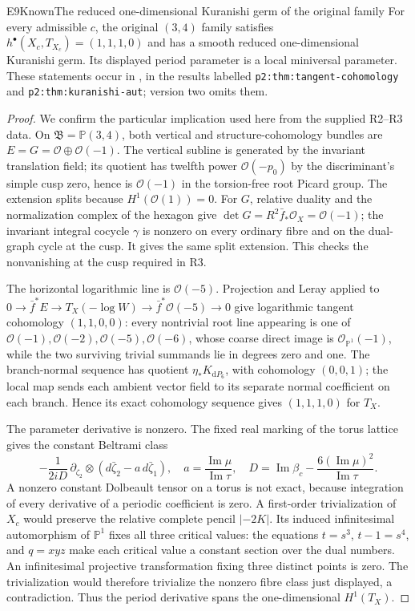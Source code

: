 \begin{statement}{E9}{Known}{The reduced one-dimensional Kuranishi germ of the original family}
For every admissible $c$, the original $(3,4)$ family satisfies
$h^\bullet(X_c,T_{X_c})=(1,1,1,0)$ and has a smooth reduced
one-dimensional Kuranishi germ. Its displayed period parameter is
a local miniversal parameter. These statements occur in
\cite{DGKX2026v1}, in the results labelled
\texttt{p2:thm:tangent-cohomology} and
\texttt{p2:thm:kuranishi-aut}; version two \cite{DGKX2026v2} omits them.
\end{statement}
\begin{proof}
We confirm the particular implication used here from the supplied
R2--R3 data. On $\mathfrak B=\mathbb P(3,4)$, both vertical and
structure-cohomology bundles are $E=G=\mathcal O\oplus\mathcal O(-1)$.
The vertical subline is generated by the invariant translation
field; its quotient has twelfth power $\mathcal O(-p_0)$ by the
discriminant's simple cusp zero, hence is $\mathcal O(-1)$ in the
torsion-free root Picard group. The extension splits because
$H^1(\mathcal O(1))=0$. For $G$, relative duality and the
normalization complex of the hexagon give
$\det G=R^2\bar f_*\mathcal O_X=\mathcal O(-1)$; the invariant
integral cocycle $\gamma$ is nonzero on every ordinary fibre and
on the dual-graph cycle at the cusp. It gives the same split
extension. This checks the nonvanishing at the cusp required in R3.

The horizontal logarithmic line is $\mathcal O(-5)$. Projection
and Leray applied to
$0\to\bar f^*E\to T_X(-\log W)\to\bar f^*\mathcal O(-5)\to0$
give logarithmic tangent cohomology $(1,1,0,0)$: every nontrivial
root line appearing is one of
$\mathcal O(-1),\mathcal O(-2),\mathcal O(-5),\mathcal O(-6)$,
whose coarse direct image is $\mathcal O_{\mathbb P^1}(-1)$,
while the two surviving trivial summands lie in degrees zero
and one. The branch-normal sequence has quotient
$\eta_*K_{\mathrm dP_6}$, with cohomology $(0,0,1)$; the local
map sends each ambient vector field to its separate normal
coefficient on each branch. Hence its exact cohomology sequence
gives $(1,1,1,0)$ for $T_X$.

The parameter derivative is nonzero. The fixed real marking of
the torus lattice gives the constant Beltrami class
\[
 -\frac{1}{2iD}\,\partial_{\zeta_2}\otimes
 (d\bar\zeta_2-a\,d\bar\zeta_1),
 \quad a=\frac{\operatorname{Im}\mu}{\operatorname{Im}\tau},
 \quad D=\operatorname{Im}\beta_c
       -\frac{6(\operatorname{Im}\mu)^2}{\operatorname{Im}\tau}.
\]
A nonzero constant Dolbeault tensor on a torus is not exact,
because integration of every derivative of a periodic coefficient
is zero. A first-order trivialization of $X_c$ would preserve
the relative complete pencil $|-2K|$. Its induced infinitesimal
automorphism of $\mathbb P^1$ fixes all three critical values:
the equations $t=s^3$, $t-1=s^4$, and $q=xyz$ make each critical
value a constant section over the dual numbers. An infinitesimal
projective transformation fixing three distinct points is zero.
The trivialization would therefore trivialize the nonzero fibre
class just displayed, a contradiction. Thus the period derivative
spans the one-dimensional $H^1(T_X)$.


\end{proof}
